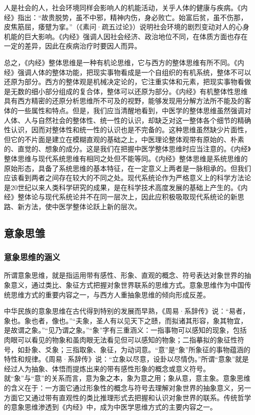 \documentclass[draft,12pt]{ctexbook}
\begin{document}
人是社会的人，社会环境同样会影响人的机能活动，关乎人体的健康与疾病。《内经》指出：“故贵脱势，虽不中邪，精神内伤，身必败亡。始富后贫，虽不伤那，皮焦筋屈，痿躄为挛。”（《素问·疏五过论》）说明社会环境的剧烈变动对人的心身机能的巨大影响。《内经》强调人因社会经济、政治地位不同，在体质方面也存在一定的差异，因此在疾病治疗时要因人而异。

总之，《内经》整体思维是一种有机论思维，它与西方的整体思维有所不同。《内经》强调人体的整体功能，把现实事物看成是一个自组织的有机系统，整体不可以还原为部分。西方的整体观是机械决定论的，它注重实体和元素，把现实事物看做是无数的细小部分组成的复合体，整体可以还原为部分。《内经》有机整体性思维具有西方精密的还原分析思维所不可及的视野，能够发现用分解方法所不能及的客体的一些属性和特点。但是，我们应当清醒地看到，中医学的整体思维虽然强调对人体、人与自然社会的整体性、统一性的认识，却缺乏对这一整体各个细节的精确性认识，因而对整体性和统一性的认识也是不完备的。这种思维虽然缺少片面性，但它的不片面是建立在模糊直观的基础之上，中医理论整体观带有原始的、朴素的、直觉的、想象的成分。这是我们在把握中医学整体思维时应当注意的。《内经》整体思维与现代系统思维有相同之处但不能等同。《内经》整体思维是系统思维的原始形态，具备了系统思维的基本特征，在一定意义上两者是一脉相承的。但我们应该看到两者之间存在较大的不同之处。现代系统论作为严格意义上的科学方法论是20世纪以来人类科学研究的成果，是在科学技术高度发展的基础上产生的。《内经》整体论与现代系统论并不在同一层次上，因此应积极吸取现代系统论的新思路、新方法，使中医学整体论跃上新的层次。

\subsection{意象思雏}%

\subsubsection{意象思维的涵义}%

所谓意象思维，就是指运用带有感性、形象、直观的概念、符号表达对象世界的抽象意义，通过类比、象征方式把握对象世界联系的思维方式。意象思维作为中国传统思维方式的重要内容之一，与西方人重抽象思维的倾向形成反差。

中华民族的意象思维在古代得到特别的发展而早熟，《周易·系辞传》说：“易者，象也。象也者，像也。”“夫象，圣人有以见天下之赜，而拟诸其形容，象其物宜，是故谓之象。”“见乃谓之象。”“象”字有三重涵义：一指事物可以感知的现象，包括肉眼可以看见的物象和虽肉眼无法看见但可以感知的物象；二指摹拟的象征性符号，如卦象、爻象；三指取象、象征，为动词意。“意”是“象”所象征的事物蕴涵的特性和规律。《周易·系辞传》说：“立象以尽意，设卦以尽情伪。”所谓“意象”就是经过人为抽象、体悟而提炼出来的带有感性形象的概念或意义符号。就“象”与“意”的关系而言，意为象之本，象为意之用；象从意，意主象。意象思维的含义在于：一方面它通过形象性的概念与符号去理解对象世界的抽象意义，另一方面它又通过带有直观性的类比推理形式去把握和认识对象世界的联系。传统哲学的意象思维渗透到《内经》中，成为中医学思维方式的主要内容之一。
\end{document}
